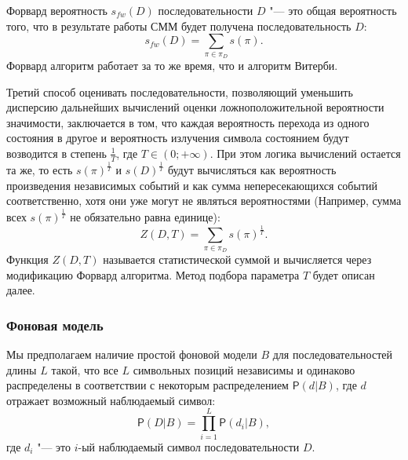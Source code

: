 \documentclass[specialist,
substylefile = spbu_report.rtx,
subf,href,colorlinks=true, 12pt]{disser}
\begin{document}
			Форвард вероятность $s_{fw}(D)$ последовательности $D$ "--- это общая вероятность того, что в результате работы СММ будет получена последовательность $D$:
			\begin{equation*}
				s_{fw}(D) = \sum_{\pi \in \pi_{D}}s(\pi). \label{eq:2}
			\end{equation*}
			Форвард алгоритм работает за то же время, что и алгоритм Витерби.
			
			Третий способ оценивать последовательности, позволяющий уменьшить дисперсию дальнейших вычислений оценки ложноположительной вероятности значимости, заключается в том, что каждая вероятность перехода из одного состояния в другое и вероятность излучения символа состоянием будут возводится в степень $\frac{1}{T}$, где $T \in (0; +\infty)$. При этом логика вычислений остается та же, то есть $s(\pi)^{\frac{1}{T}}$ и $s(D)^{\frac{1}{T}}$ будут вычисляться как вероятность произведения независимых событий и как сумма непересекающихся событий соответственно, хотя они уже могут не являться вероятностями (Например, сумма всех $s(\pi)^\frac{1}{T}$ не обязательно равна единице):
			\begin{equation*}
				Z(D, T)	= \sum_{\pi \in \pi_{D}}s(\pi)^{\frac{1}{T}}. \label{eq:3}
			\end{equation*}		
			Функция $Z(D, T)$ называется статистической суммой и вычисляется через модификацию Форвард алгоритма. Метод подбора параметра $T$ будет описан далее.
			
			\subsubsection{Фоновая модель}
			Мы предполагаем наличие простой фоновой модели $B$ для последовательностей длины $L$ такой, что все $L$ символьных позиций независимы и одинаково распределены в соответствии с некоторым распределением $\mathsf{P}(d|B)$, где $d$ отражает возможный наблюдаемый символ:
			\begin{equation}
				\mathsf{P}(D|B) = \prod_{i=1}^{L}\mathsf{P}(d_{i}|B), \label{eq:4}
			\end{equation}
			где $d_{i}$ "--- это $i$-ый наблюдаемый символ последовательности $D$.
			
\end{document}
